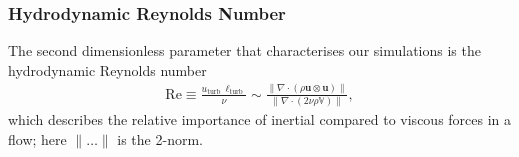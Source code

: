 \documentclass[12pt,twoside]{extreport}
\newcommand{\mVector}[1]{\bm{#1}} %
\newcommand{\mTensor}[1]{\mathbb{#1}} %
\newcommand{\mReh}{\ensuremath{\mathrm{Re}}} %
\providecommand{\DIFaddbegin}{} %
\providecommand{\DIFaddend}{} %
\providecommand{\DIFdelbegin}{} %
\providecommand{\DIFdelend}{} %
\providecommand{\DIFscaledelfig}{0.5}
\newlength{\DIFdelgraphicswidth} %
\newlength{\DIFdelgraphicsheight} %
\providecommand{\DIFaddincludegraphics}[2][]{{\color{DIFgreen}\fbox{\DIFOincludegraphics[#1]{#2}}}} %
\providecommand{\DIFdelincludegraphics}[2][]{%
\sbox{\DIFdelgraphicsbox}{\DIFOincludegraphics[#1]{#2}}%
\settoboxwidth{\DIFdelgraphicswidth}{\DIFdelgraphicsbox} %
\settoboxtotalheight{\DIFdelgraphicsheight}{\DIFdelgraphicsbox} %
\scalebox{\DIFscaledelfig}{%
\parbox[b]{\DIFdelgraphicswidth}{\usebox{\DIFdelgraphicsbox}\\[-\baselineskip] \rule{\DIFdelgraphicswidth}{0em}}\llap{\resizebox{\DIFdelgraphicswidth}{\DIFdelgraphicsheight}{%
\setlength{\unitlength}{\DIFdelgraphicswidth}%
\begin{picture}(1,1)%
\thicklines\linethickness{2pt} %
{\color{DIFpurple}\put(0,0){\framebox(1,1){}}}%
{\color{DIFpurple}\put(0,0){\line( 1,1){1}}}%
{\color{DIFpurple}\put(0,1){\line(1,-1){1}}}%
\end{picture}%
}\hspace*{3pt}}} %
} %
\DeclareRobustCommand{\DIFaddbegin}{\DIFOaddbegin \let\includegraphics\DIFaddincludegraphics} %
\DeclareRobustCommand{\DIFaddend}{\DIFOaddend \let\includegraphics\DIFOincludegraphics} %
\DeclareRobustCommand{\DIFdelbegin}{\DIFOdelbegin \let\includegraphics\DIFdelincludegraphics} %
\DeclareRobustCommand{\DIFdelend}{\DIFOaddend \let\includegraphics\DIFOincludegraphics} %
\begin{document}
\subsubsection{Hydrodynamic Reynolds Number}

The second dimensionless parameter that characterises our simulations is the hydrodynamic Reynolds number
\DIFdelbegin %
\DIFdelend \DIFaddbegin \begin{align}
    \mReh
        \equiv \frac{u_\mathrm{turb} \,\ell_\mathrm{turb}}{\nu}
        \sim \frac{
                \|\nabla\cdot(\rho\mVector{u}\otimes\mVector{u})\|
            }{
                \|\nabla\cdot(2\nu\rho\mTensor{V})\|
            }
        , \label{dfn:Reyh}
\end{align}\DIFaddend
which describes the relative importance of inertial compared to viscous forces in a flow; here $\|\dots\|$ is the 2-norm.
\end{document}
